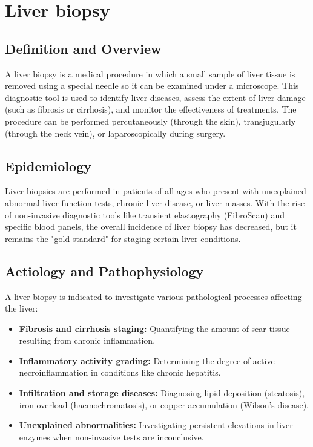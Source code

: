 \chapter{Liver biopsy}

\section*{Definition and Overview}
A liver biopsy is a medical procedure in which a small sample of liver tissue is removed using a special needle so it can be examined under a microscope. This diagnostic tool is used to identify liver diseases, assess the extent of liver damage (such as fibrosis or cirrhosis), and monitor the effectiveness of treatments. The procedure can be performed percutaneously (through the skin), transjugularly (through the neck vein), or laparoscopically during surgery.

\section*{Epidemiology}
Liver biopsies are performed in patients of all ages who present with unexplained abnormal liver function tests, chronic liver disease, or liver masses. With the rise of non-invasive diagnostic tools like transient elastography (FibroScan) and specific blood panels, the overall incidence of liver biopsy has decreased, but it remains the "gold standard" for staging certain liver conditions.

\section*{Aetiology and Pathophysiology}
A liver biopsy is indicated to investigate various pathological processes affecting the liver:

\begin{itemize}
    \item \textbf{Fibrosis and cirrhosis staging:} Quantifying the amount of scar tissue resulting from chronic inflammation.
    \item \textbf{Inflammatory activity grading:} Determining the degree of active necroinflammation in conditions like chronic hepatitis.
    \item \textbf{Infiltration and storage diseases:} Diagnosing lipid deposition (steatosis), iron overload (haemochromatosis), or copper accumulation (Wilson's disease).
    \item \textbf{Unexplained abnormalities:} Investigating persistent elevations in liver enzymes when non-invasive tests are inconclusive.
\end{itemize}

